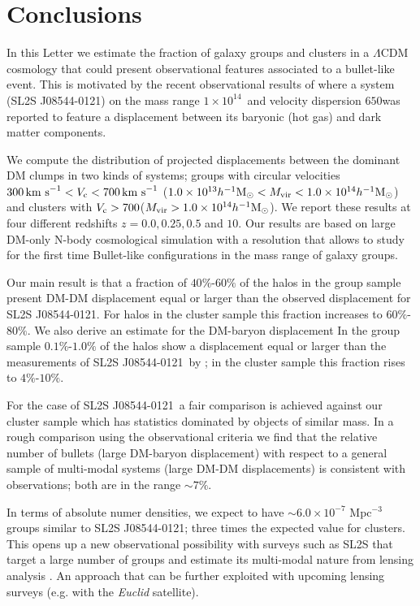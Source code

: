 \documentclass{emulateapj}
\newcommand{\hMsun}{{\ifmmode{h^{-1}{\rm {M_{\odot}}}}\else{$h^{-1}{\rm{M_{\odot}}}$}\fi}}
\newcommand{\kms}{{\ifmmode{{\mathrm{\,km\ s}^{-1}}}\else{\,km~s$^{-1}$}\fi}}
\newcommand{\bullg}{SL2S J08544-0121}
\begin{document}
\section{Conclusions}
\label{sec:conclusions}

In this Letter we estimate the fraction of galaxy groups and clusters
in a $\Lambda$CDM cosmology that could present observational features
associated to a bullet-like event. This is motivated by the recent
observational results of \citep{Gastaldello} where a system (\bullg)
on the mass range $1\times 10^{14}$\hMsun\ and velocity dispersion
$650$\kms was reported to feature a displacement between its baryonic
(hot gas) and dark matter components. 

We compute the distribution of projected displacements
between the dominant DM clumps in two kinds of systems; groups with
circular velocities $300\kms<V_{\rm c}<700\kms$ ($1.0\times
10^{13}\hMsun < M_{\rm vir}<1.0\times 10^{14}\hMsun$) and clusters with $V_{\rm
  c}>700$\kms ($M_{\rm vir}>1.0\times 10^{14}\hMsun$). We report these
results at four different redshifts $z=0.0,0.25,0.5$ and $10$. Our
results are based on large DM-only N-body cosmological simulation with
a resolution that allows to study for the first time Bullet-like
configurations in the mass range of galaxy groups. 

Our main result is that a fraction of $40\%$-$60\%$ of the halos
in the group sample present DM-DM displacement equal or larger than the
observed displacement for \bullg. For halos in the cluster sample this
fraction increases to $60\%$-$80\%$. We also derive an
estimate for the DM-baryon displacement In the group sample
$0.1\%$-$1.0\%$ of the halos show a displacement equal or larger than
the  measurements of \bullg\ by \citep{Gastaldello}; in the cluster
sample this fraction rises to $4\%$-$10\%$. 

For the case of \bullg\ a fair comparison is achieved against our cluster
sample which has statistics dominated by objects of similar mass. In
a rough comparison using the observational criteria \citep{Foex2013,
  Gastaldello} we find that the relative number of bullets
(large DM-baryon displacement) with respect to a general sample of
multi-modal systems (large DM-DM displacements) is consistent with
observations; both are in the range $\sim 7\%$. 

In terms of absolute numer densities, we expect to have $\sim 6.0\times
10^{-7}$ Mpc$^{-3}$ groups similar to \bullg; three times the expected
value for clusters. This opens up a new observational possibility with surveys
such as SL2S that target a large number of groups and estimate its
multi-modal nature from lensing analysis \citep{Foex2013}. An approach
that can be further exploited with upcoming lensing surveys (e.g. with
the {\it Euclid} satellite). 
\end{document}
